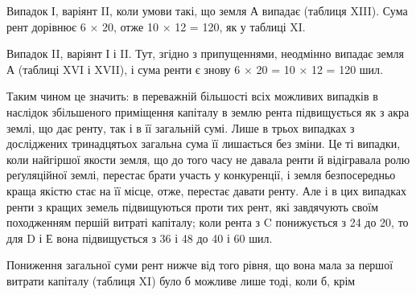 Випадок І, варіянт II, коли умови такі, що земля А випадає (таблиця XIII).
Сума рент дорівнює 6 × 20, отже 10 × 12 = 120, як у таблиці XI.

Випадок II, варіянт І і II. Тут, згідно з припущеннями, неодмінно випадає
земля А (таблиці XVI і XVII), і сума ренти є знову 6 × 20 = 10 × 12 =
120 шил.

Таким чином це значить: в переважній більшості всіх можливих випадків
в наслідок збільшеного приміщення капіталу в землю рента підвищується як
з акра землі, що дає ренту, так і в її загальній сумі. Лише в трьох випадках
з досліджених тринадцятьох загальна сума її лишається без зміни. Це ті випадки,
коли найгіршої якости земля, що до того часу не давала ренти й відігравала
ролю реґуляційної землі, перестає брати участь у конкуренції, і земля безпосередньо
краща якістю стає на її місце, отже, перестає давати ренту. Але і в
цих випадках ренти з кращих земель підвищуються проти тих рент, які завдячують
своїм походженням першій витраті капіталу; коли рента з C понижується
з 24 до 20, то для D і Е вона підвищується з 36 і 48 до 40 і 60 шил.

Пониження загальної суми рент нижче від того рівня, що вона мала за
першої витрати капіталу (таблиця XI) було б можливе лише тоді, коли б, крім
\parbreak{}  %
